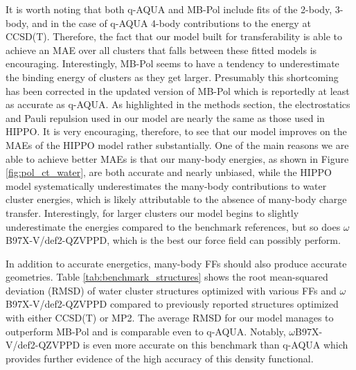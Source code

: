 \documentclass[journal=jctcce,manuscript=article]{achemso}
\begin{document}
It is worth noting that both q-AQUA and MB-Pol include fits of the 2-body, 3-body, and in the case of q-AQUA 4-body contributions to the energy at CCSD(T). Therefore, the fact that our model built for transferability is able to achieve an MAE over all clusters that falls between these fitted models is encouraging. Interestingly, MB-Pol seems to have a tendency to underestimate the binding energy of clusters as they get larger. Presumably this shortcoming has been corrected in the updated version of MB-Pol\cite{zhu2023mb} which is reportedly at least as accurate as q-AQUA. As highlighted in the methods section, the electrostatics and Pauli repulsion used in our  model are nearly the same as those used in HIPPO.\cite{rackers2021polarizable} It is very encouraging, therefore, to see that our model improves on the MAEs of the HIPPO model rather substantially. One of the main reasons we are able to achieve better MAEs is that our many-body energies, as shown in Figure \ref{fig:pol_ct_water}, are both accurate and nearly unbiased, while the HIPPO model systematically underestimates the many-body contributions to water cluster energies\cite{rackers2021polarizable}, which is likely attributable to the absence of many-body charge transfer. Interestingly, for larger clusters our model begins to slightly underestimate the energies compared to the benchmark references, but so does $\omega$B97X-V/def2-QZVPPD, which is the best our force field can possibly perform.

In addition to accurate energetics, many-body FFs should also produce accurate geometries. Table \ref{tab:benchmark_structures} shows the root mean-squared deviation (RMSD) of water cluster structures optimized with various FFs and $\omega$B97X-V/def2-QZVPPD compared to previously reported structures optimized with either CCSD(T) or MP2.\cite{herman2023extensive} The average RMSD for our model manages to outperform MB-Pol and is comparable even to q-AQUA. Notably, $\omega$B97X-V/def2-QZVPPD is even more accurate on this benchmark than q-AQUA which provides further evidence of the high accuracy of this density functional.
\end{document}
